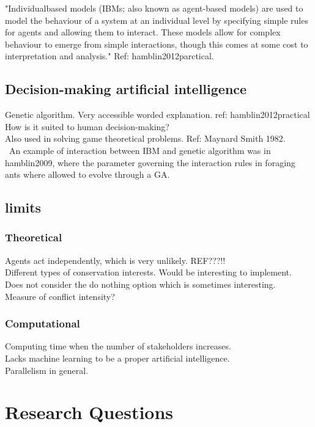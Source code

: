 \documentclass[12pt,a4paper]{article}
\begin{document}
"Individualbased
models (IBMs; also known as agent-based models) are
used to model the behaviour of a system at an individual level
by specifying simple rules for agents and allowing them to
interact. These models allow for complex behaviour to emerge
from simple interactions, though this comes at some cost to
interpretation and analysis." Ref: hamblin2012parctical.

\subsection{Decision-making artificial intelligence}

Genetic algorithm. Very accessible worded explanation. ref: hamblin2012practical\\
How is it suited to human decision-making?\\
Also used in solving game theoretical problems. Ref: Maynard Smith 1982.\\\
An example of interaction between IBM and genetic algorithm was in hamblin2009, where the parameter governing the interaction rules in foraging ants where allowed to evolve through a GA. 

\subsection{limits}

\subsubsection{Theoretical}

Agents act independently, which is very unlikely. REF???!!\\
Different types of conservation interests.
Would be interesting to implement.\\
Does not consider the do nothing option which is sometimes interesting.\\
Measure of conflict intensity?

\subsubsection{Computational}
Computing time when the number of stakeholders increases.\\
Lacks machine learning to be a proper artificial intelligence.\\
Parallelism in general.

\section{Research Questions}
\end{document}
